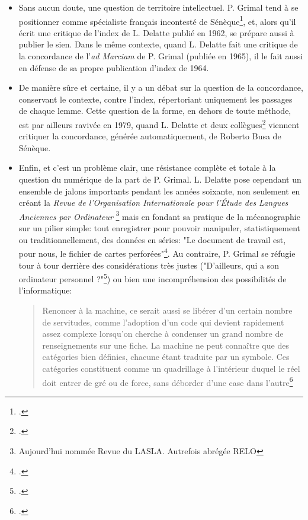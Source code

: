 \begin{itemize}
    \item Sans aucun doute, une question de territoire intellectuel. P. Grimal tend à se positionner comme spécialiste français incontesté de Sénèque\footcite{verdiere_pierre_1970}, et, alors qu'il écrit une critique de l'index de L. Delatte publié en 1962, se prépare aussi à publier le sien. Dans le même contexte, quand L. Delatte fait une critique de la concordance de l'\textit{ad Marciam} de P. Grimal (publiée en 1965), il le fait aussi en défense de sa propre publication d'index de 1964.
    \item De manière sûre et certaine, il y a un débat sur la question de la concordance, conservant le contexte, contre l'index, répertoriant uniquement les passages de chaque lemme. Cette question de la forme, en dehors de toute méthode, est par ailleurs ravivée en 1979, quand L. Delatte et deux collègues\footcite{delatte_concordantiae_1979} viennent critiquer la concordance, générée automatiquement, de Roberto Busa de Sénèque.
    \item Enfin, et c'est un problème clair, une résistance complète et totale à la question du numérique de la part de P. Grimal. L. Delatte pose cependant un ensemble de jalons importants pendant les années soixante, non seulement en créant la \textit{Revue de l'Organisation Internationale pour l'Étude des Langues Anciennes par Ordinateur} \footnote{Aujourd'hui nommée Revue du LASLA. Autrefois abrégée RELO} mais en fondant sa pratique de la mécanographie sur un pilier simple: tout enregistrer pour pouvoir manipuler, statistiquement ou traditionnellement, des données en séries: "Le document de travail est, pour nous, le fichier de cartes perforées"\footcite[p~.202]{delatte_index_1968}. Au contraire, P. Grimal se réfugie tour à tour derrière des considérations très justes ("D’ailleurs, qui a son ordinateur personnel ?"\footcite[p.~111]{grimal_index_1966}) ou bien une incompréhension des possibilités de l'informatique:
    
    \blockquote{Renoncer à la machine, ce serait aussi se libérer d'un certain nombre de servitudes, comme l'adoption d'un code qui devient rapidement assez complexe lorsqu'on cherche à condenser un grand nombre de renseignements sur une fiche. La machine ne peut connaître que des catégories bien définies, chacune étant traduite par un symbole. Ces catégories constituent comme un quadrillage à l'intérieur duquel le réel doit entrer de gré ou de force, sans déborder d'une case dans l'autre\footcite[p.~131]{grimal_delatte_1964}}
\end{itemize}


